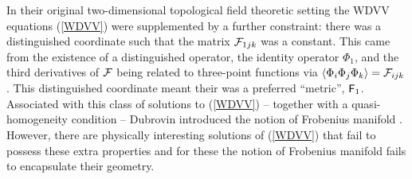 \documentclass[a4paper,]{article}
\def\F{{\cal F}}
\def\f{{\sf F}}
\begin{document}
In their original two-dimensional topological field theoretic setting
the WDVV equations (\ref{WDVV}) were supplemented by a further constraint:
there was a distinguished coordinate such that the matrix
$\F_{1jk}$ was a constant.
This came from the existence of a distinguished operator, the identity
operator $\Phi_1$, and the third derivatives of $\F$ being related to 
three-point functions via
$\langle \Phi_i\Phi_j\Phi_k\rangle=  \F_{ijk}$. 
This distinguished coordinate meant their was a preferred ``metric'', $\f_1$.
Associated with this class of solutions to (\ref{WDVV}) -- together with
a quasi-homogeneity condition -- Dubrovin introduced the notion of
Frobenius manifold \cite{Dub}. However, there are physically
interesting solutions of (\ref{WDVV}) that fail to possess these extra
properties and for these the notion of Frobenius manifold fails to 
encapsulate their geometry.
\end{document}
